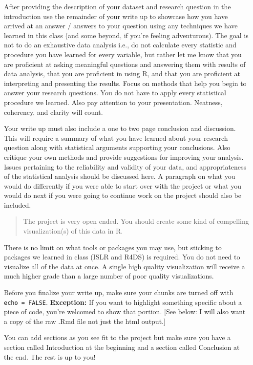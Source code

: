 \documentclass[
]{book}
\begin{document}
After providing the description of your dataset and research question in the
introduction use the remainder of your write up to showcase how you have arrived at
an answer / answers to your question using any techniques we have learned in this
class (and some beyond, if you're feeling adventurous). The goal is not to do an exhaustive
data analysis i.e., do not calculate every statistic and procedure you have
learned for every variable, but rather let me know that you are proficient at
asking meaningful questions and answering them with results of data analysis, that
you are proficient in using R, and that you are proficient at interpreting and
presenting the results. Focus on methods that help you begin to answer your research
questions. You do not have to apply every statistical procedure we learned.
Also pay attention to your presentation. Neatness, coherency, and clarity will count.

Your write up must also include a one to two page conclusion and discussion.
This will require a summary of what you have learned about your research
question along with statistical arguments supporting your conclusions. Also
critique your own methods and provide suggestions for improving your analysis.
Issues pertaining to the reliability and validity of your data, and
appropriateness of the statistical analysis should be discussed here. A
paragraph on what you would do differently if you were able to start over
with the project or what you would do next if you were going to continue
work on the project should also be included.

\begin{quote}
The project is very open ended. You should create some kind of compelling
visualization(s) of this data in R.
\end{quote}

There is no limit on what tools or packages you may use, but sticking to packages we learned in class (ISLR and R4DS)
is required. You do not need to visualize all of the data at once. A single high quality
visualization will receive a much higher grade than a large number of poor quality
visualizations.

Before you finalize your write up, make sure your chunks are turned off
with \texttt{echo\ =\ FALSE}. \textbf{Exception:} If you want to
highlight something specific about a piece of code, you're welcomed to show
that portion. {[}See below: I will also want a copy of the raw .Rmd file not just the html output.{]}

You can add sections as you see fit to the project but make sure
you have a section called Introduction at the beginning and a section called
Conclusion at the end. The rest is up to you!
\end{document}
